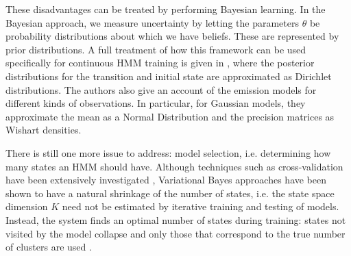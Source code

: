 \documentclass[pdftex,11pt,a4paper]{article}
\theoremstyle{definition}
\theoremstyle{remark}
\begin{document}
\par These disadvantages can be treated by performing Bayesian learning. In the Bayesian approach, we measure uncertainty by letting the parameters $\theta$ be probability distributions about which we have beliefs. These are represented by prior distributions. A full treatment of how this framework can be used specifically for continuous HMM training is given in \cite{Rezek2005}, where the posterior distributions for the transition and initial state are approximated as Dirichlet distributions. The authors also give an account of the emission models for different kinds of observations. In particular, for Gaussian models, they approximate the mean as a Normal Distribution and the precision matrices as Wishart densities. 
\par There is still one more issue to address: model selection, i.e. determining how many states an HMM should have. Although techniques such as cross-validation have been extensively investigated \cite{Siddiqi2007,Rezek2005}, Variational Bayes approaches have been shown to have a natural shrinkage of the number of states, i.e. the state space dimension $K$ need not be estimated by iterative training and testing of models. Instead, the system finds an optimal number of states during training: states not visited by the model collapse and only those that correspond to the true number of clusters are used \cite{Rezek2005}. 
\end{document}
